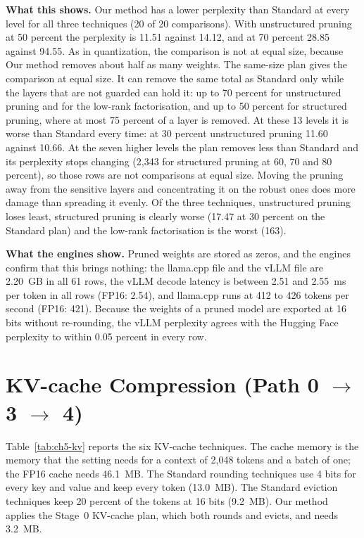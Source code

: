 \documentclass[
11pt, %
english, %
singlespacing, %
headsepline, %
]{MastersDoctoralThesis} %
\begin{document}
\textbf{What this shows.} Our method has a lower perplexity than Standard at every level for all three techniques (20 of 20 comparisons). With unstructured pruning at 50 percent the perplexity is 11.51 against 14.12, and at 70 percent 28.85 against 94.55. As in quantization, the comparison is not at equal size, because Our method removes about half as many weights. The same-size plan gives the comparison at equal size. It can remove the same total as Standard only while the layers that are not guarded can hold it: up to 70 percent for unstructured pruning and for the low-rank factorisation, and up to 50 percent for structured pruning, where at most 75 percent of a layer is removed. At these 13 levels it is worse than Standard every time: at 30 percent unstructured pruning 11.60 against 10.66. At the seven higher levels the plan removes less than Standard and its perplexity stops changing (2{,}343 for structured pruning at 60, 70 and 80 percent), so those rows are not comparisons at equal size. Moving the pruning away from the sensitive layers and concentrating it on the robust ones does more damage than spreading it evenly. Of the three techniques, unstructured pruning loses least, structured pruning is clearly worse (17.47 at 30 percent on the Standard plan) and the low-rank factorisation is the worst (163).

\textbf{What the engines show.} Pruned weights are stored as zeros, and the engines confirm that this brings nothing: the llama.cpp file and the vLLM file are 2.20~GB in all 61 rows, the vLLM decode latency is between 2.51 and 2.55~ms per token in all rows (FP16: 2.54), and llama.cpp runs at 412 to 426 tokens per second (FP16: 421). Because the weights of a pruned model are exported at 16 bits without re-rounding, the vLLM perplexity agrees with the Hugging Face perplexity to within 0.05 percent in every row.

\section{KV-cache Compression (Path 0 $\rightarrow$ 3 $\rightarrow$ 4)}
\label{sec:ch5-kv}

Table~\ref{tab:ch5-kv} reports the six KV-cache techniques. The cache memory is the memory that the setting needs for a context of 2{,}048 tokens and a batch of one; the FP16 cache needs 46.1~MB. The Standard rounding techniques use 4 bits for every key and value and keep every token (13.0~MB). The Standard eviction techniques keep 20 percent of the tokens at 16 bits (9.2~MB). Our method applies the Stage~0 KV-cache plan, which both rounds and evicts, and needs 3.2~MB.
\end{document}
